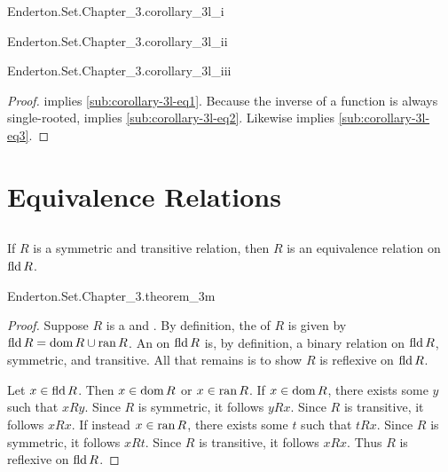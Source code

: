 \documentclass{report}
\begin{document}
    {Enderton.Set.Chapter\_3.corollary\_3l\_i}

    {Enderton.Set.Chapter\_3.corollary\_3l\_ii}

    {Enderton.Set.Chapter\_3.corollary\_3l\_iii}

  \begin{proof}
     implies \eqref{sub:corollary-3l-eq1}.
    Because the inverse of a function is always single-rooted,
       implies \eqref{sub:corollary-3l-eq2}.
    Likewise  implies \eqref{sub:corollary-3l-eq3}.
  \end{proof}

\section{Equivalence Relations}%

\subsection{}%

  \begin{theorem}[3M]
    If $R$ is a symmetric and transitive relation, then $R$ is an equivalence
      relation on $\mathop{\text{fld}}{R}$.
  \end{theorem}

    {Enderton.Set.Chapter\_3.theorem\_3m}

  \begin{proof}
    Suppose $R$ is a  and 
      .
    By definition, the  of $R$ is given by
      $\mathop{\text{fld}}{R} = \mathop{\text{dom}}{R} \cup \mathop{\text{ran}}{R}$.
    An  on $\mathop{\text{fld}}{R}$ is, by definition, a
      binary relation  on $\mathop{\text{fld}}{R}$, symmetric, and
      transitive.
    All that remains is to show $R$ is reflexive on $\mathop{\text{fld}}{R}$.

    Let $x \in \mathop{\text{fld}}{R}$.
    Then $x \in \mathop{\text{dom}}{R}$ or $x \in \mathop{\text{ran}}{R}$.
    If $x \in \mathop{\text{dom}}{R}$, there exists some $y$ such that $xRy$.
    Since $R$ is symmetric, it follows $yRx$.
    Since $R$ is transitive, it follows $xRx$.
    If instead $x \in \mathop{\text{ran}}{R}$, there exists some $t$ such that $tRx$.
    Since $R$ is symmetric, it follows $xRt$.
    Since $R$ is transitive, it follows $xRx$.
    Thus $R$ is reflexive on $\mathop{\text{fld}}{R}$.
  \end{proof}
\end{document}
